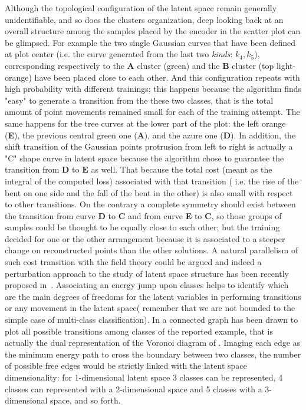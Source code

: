 Although the topological configuration of the latent space remain generally unidentifiable, and so does the clusters organization, deep looking back at \Figure{\ref{fig:step_1}} an overall structure among the samples placed by the encoder in the scatter plot can be glimpsed. For example the two single Gaussian curves that have been defined at plot center (i.e. the curve generated from the last two \textit{kinds}: $k_4, k_5$), corresponding respectively to the $\bm{A}$ cluster (green) and the $\bm{B}$ cluster (top light-orange) have been placed close to each other. And this configuration repeats with high probability with different trainings; this happens because the algorithm finds "easy" to generate a transition from the these two classes, that is the total amount of point movements remained small for each of the training attempt. The same happens for the tree curves at the lower part of the plot: the left orange (\textbf{E}), the previous central green one (\textbf{A}), and the azure one (\textbf{D}). In addition, the shift transition of the Gaussian points protrusion from left to right is actually a "C" shape curve in latent space because the algorithm chose to guarantee the transition from $\bm{D}$ to $\bm{E}$ as well. That because the total cost (meant as the integral of the computed loss) associated with that transition ( i.e. the rise of the bent on one side and the fall of the bent in the other) is also small with respect to other transitions. On the contrary a complete symmetry should exist between the transition from curve \textbf{D} to \textbf{C} and from curve \textbf{E} to \textbf{C}, so those groups of samples could be thought to be equally close to each other; but the training decided for one or the other arrangement because it is associated to a steeper change on reconstructed points than the other solutions. A natural parallelism of such cost transition with the field theory could be argued and indeed a perturbation approach to the study of latent space structure has been recently proposed in~\cite{andrsterr2019perturbation}. Associating an energy jump upon classes helps to identify which are the main degrees of freedoms for the latent variables in performing transitions or any movement in the latent space( remember that we are not bounded to the simple case of multi-class classification).
In \Figure{\ref{fig:voronoi_2d}} a connected graph has been drawn to plot all possible transitions among classes of the reported example, that is actually the dual representation of the Voronoi diagram of \Figure{\ref{fig:voronoi_ls}}. Imaging each edge as the minimum energy path to cross the boundary between two classes, the number of possible free edges would be strictly linked with the latent space dimensionality: for 1-dimensional latent space 3 classes can be represented, 4 classes can represented with a 2-dimensional space and 5 classes with a 3-dimensional space, and so forth. 
